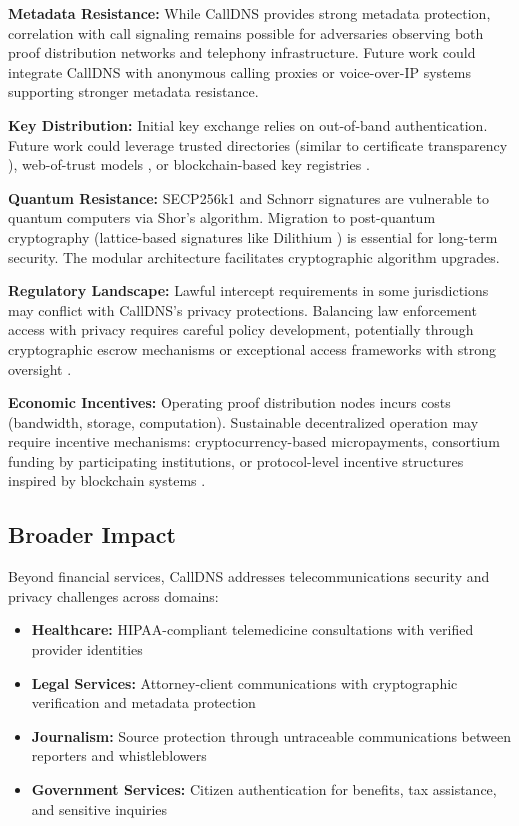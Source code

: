 \documentclass[11pt,twocolumn]{article}
\begin{document}
\textbf{Metadata Resistance:} While CallDNS provides strong metadata protection, correlation with call signaling remains possible for adversaries observing both proof distribution networks and telephony infrastructure. Future work could integrate CallDNS with anonymous calling proxies or voice-over-IP systems supporting stronger metadata resistance.

\textbf{Key Distribution:} Initial key exchange relies on out-of-band authentication. Future work could leverage trusted directories (similar to certificate transparency \cite{laurie2013}), web-of-trust models \cite{zimmermann1995}, or blockchain-based key registries \cite{fromknecht2014}.

\textbf{Quantum Resistance:} SECP256k1 and Schnorr signatures are vulnerable to quantum computers via Shor's algorithm. Migration to post-quantum cryptography (lattice-based signatures like Dilithium \cite{ducas2018}) is essential for long-term security. The modular architecture facilitates cryptographic algorithm upgrades.

\textbf{Regulatory Landscape:} Lawful intercept requirements in some jurisdictions may conflict with CallDNS's privacy protections. Balancing law enforcement access with privacy requires careful policy development, potentially through cryptographic escrow mechanisms or exceptional access frameworks with strong oversight \cite{abelson2015}.

\textbf{Economic Incentives:} Operating proof distribution nodes incurs costs (bandwidth, storage, computation). Sustainable decentralized operation may require incentive mechanisms: cryptocurrency-based micropayments, consortium funding by participating institutions, or protocol-level incentive structures inspired by blockchain systems \cite{nakamoto2008}.

\subsection{Broader Impact}

Beyond financial services, CallDNS addresses telecommunications security and privacy challenges across domains:
\begin{itemize}
\item \textbf{Healthcare:} HIPAA-compliant telemedicine consultations with verified provider identities
\item \textbf{Legal Services:} Attorney-client communications with cryptographic verification and metadata protection
\item \textbf{Journalism:} Source protection through untraceable communications between reporters and whistleblowers
\item \textbf{Government Services:} Citizen authentication for benefits, tax assistance, and sensitive inquiries
\end{itemize}
\end{document}
